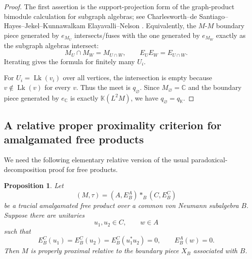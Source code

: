 \documentclass[12pt]{article}
\newtheorem{proposition}[theorem]{Proposition}
\theoremstyle{definition}
\newcommand{\Lk}{\operatorname{Lk}}
\newcommand{\K}{\mathbb K}
\newcommand{\C}{\mathbb C}
\newcommand{\freeprod}{\mathop{*}}
\begin{document}
\begin{proof}
The first assertion is the support-projection form of the graph-product bimodule calculation for subgraph algebras; see Charlesworth--de Santiago--Hayes--Jekel--Kunnawalkam Elayavalli--Nelson \cite[Theorem 0.4, Theorem 5.4, and Proposition 5.5]{CDHJKEN}.  Equivalently, the $M$-$M$ boundary piece generated by $e_{M_U}$ intersects/fuses with the one generated by $e_{M_W}$ exactly as the subgraph algebras intersect:
\[
M_U\cap M_W=M_{U\cap W},
\qquad
E_U E_W=E_{U\cap W}.
\]
Iterating gives the formula for finitely many $U_i$.

For $U_i=\Lk(v_i)$ over all vertices, the intersection is empty because $v\notin \Lk(v)$ for every $v$.  Thus the meet is $q_\varnothing$.  Since $M_\varnothing=\C$ and the boundary piece generated by $e_{\C}$ is exactly $\K(L^2M)$, we have $q_\varnothing=q_{\K}$.
\end{proof}

\subsection{A relative proper proximality criterion for amalgamated free products}

We need the following elementary relative version of the usual paradoxical-decomposition proof for free products.

\begin{proposition}\label{prop:AFP}
Let
\[
(M,\tau)=(A,E_B^A)\freeprod_B(C,E_B^C)
\]
be a tracial amalgamated free product over a common von Neumann subalgebra $B$.  Suppose there are unitaries
\[
u_1,u_2\in C,\qquad w\in A
\]
such that
\[
E_B^C(u_1)=E_B^C(u_2)=E_B^C(u_1^*u_2)=0,
\qquad
E_B^A(w)=0.
\]
Then $M$ is properly proximal relative to the boundary piece $X_B$ associated with $B$.
\end{proposition}
\end{document}
